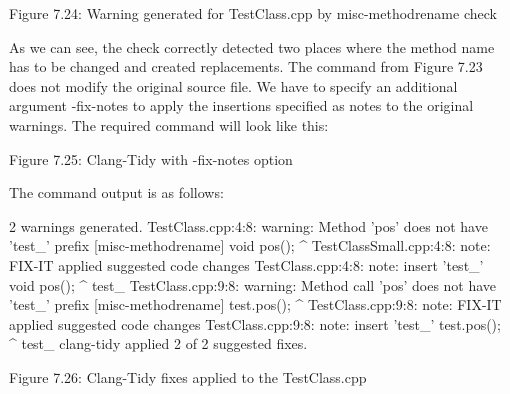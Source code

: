 \begin{center}
Figure 7.24: Warning generated for TestClass.cpp by misc-methodrename check
\end{center}


As we can see, the check correctly detected two places where the method name has to be changed and created replacements. The command from Figure 7.23 does not modify the original source file. We have to specify an additional argument -fix-notes to apply the insertions specified as notes to the original warnings. The required command will look like this:



\begin{center}
Figure 7.25: Clang-Tidy with -fix-notes option
\end{center}

The command output is as follows:

\begin{shell}
2 warnings generated.
TestClass.cpp:4:8: warning: Method ’pos’ does not have ’test_’ prefix
[misc-methodrename]
  void pos(){};
       ^
TestClassSmall.cpp:4:8: note: FIX-IT applied suggested code changes
TestClass.cpp:4:8: note: insert ’test_’
  void pos(){};
       ^
       test_
TestClass.cpp:9:8: warning: Method call ’pos’ does not have ’test_’ prefix
[misc-methodrename]
  test.pos();
       ^
TestClass.cpp:9:8: note: FIX-IT applied suggested code changes
TestClass.cpp:9:8: note: insert ’test_’
  test.pos();
       ^
       test_
clang-tidy applied 2 of 2 suggested fixes.
\end{shell}


\begin{center}
Figure 7.26: Clang-Tidy fixes applied to the TestClass.cpp
\end{center}

